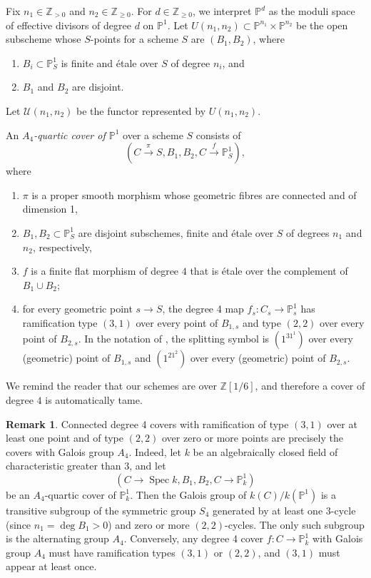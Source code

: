 \documentclass{amsart}
\numberwithin{equation}{section} \numberwithin{figure}{section}
\DeclareMathOperator{\Spec}{Spec}
\newcommand\PP{\mathbb{P}}
\newcommand\ZZ{\mathbb{Z}}
\newcommand{\cU}{\mathcal{U}}
\theoremstyle{one}
\theoremstyle{definition}
\newtheorem{remark}[theorem]{Remark}
\begin{document}
Fix 
\(n_1\in\mathbb{Z}_{>0}\) and 
\(n_2\in\mathbb{Z}_{\geq 0}\).
For
\(d\in\mathbb{Z}_{\geq 0}\), we interpret \(\PP^d\) as the moduli space of effective divisors of degree \(d\) on \(\PP^1\).
Let \(U(n_1,n_2) \subset \PP^{n_1} \times \PP^{n_2}\) be the open subscheme whose \(S\)-points for a scheme $S$ are \((B_1,B_2)\), where
\begin{enumerate}
\item \(B_i \subset \PP^{1}_S\) is finite and \'etale over \(S\) of degree \(n_i\), and 
 \item \(B_1\) and \(B_2\) are disjoint. 
 \end{enumerate}
 Let \(\cU(n_1,n_2)\) be the functor represented by \(U(n_1,n_2)\).
 
An \emph{\(A_4\)-quartic cover of $\PP^1$} over a scheme \(S\) consists of \[(C \xrightarrow{\pi} S, B_1, B_2, C \xrightarrow{f} \PP^1_S),\] 
where
\begin{enumerate}
\item \(\pi\) is a proper smooth morphism whose geometric fibres are connected and of dimension 1,
\item \(B_1, B_2 \subset \PP^1_S\) are disjoint subschemes, finite and \'etale over \(S\) of degrees \(n_1\) and \(n_2\), respectively,
\item \(f\) is a finite flat morphism of degree \(4\) that is \'etale over the complement of \(B_1 \cup B_2\);
\item for every geometric point \(s \to S\), the degree 4 map \(f_s \colon C_s \to \PP^1_s\) has ramification type \((3,1)\) over every point of \(B_{1,s}\) and type \((2,2)\) over every point of \(B_{2,s}\).
  In the notation of \cite[\S~2]{bha:07}, the splitting symbol is \((1^31^1)\) over every (geometric) point of \(B_{1,s}\) and \((1^21^2)\) over every (geometric) point of \(B_{2,s}\).
\end{enumerate}
We remind the reader that our schemes are over \(\ZZ[1/6]\), and therefore a cover of degree \(4\) is automatically tame.
\begin{remark}\label{rem:A4}
  Connected degree 4 covers with ramification of type \((3,1)\) over at least one point and of type \((2,2)\) over zero or more points are precisely the covers with Galois group \(A_4\).
  Indeed, let \(k\) be an algebraically closed field of characteristic greater than 3, and let \[(C\to \Spec{k}, B_1,B_2,  C \to \PP^1_k)\] 
  be an \(A_4\)-quartic cover of $\PP^1_k$.
  Then the Galois group of \(k(C) / k(\PP^1)\) is a transitive subgroup of the symmetric group \(S_4\) generated by at least one 3-cycle (since \(n_1 = \deg B_1 > 0\)) and zero or more \((2,2)\)-cycles.
  The only such subgroup is the alternating group \(A_4\).
  Conversely, any degree 4 cover \(f \colon C \to \PP^1_k\) with Galois group \(A_4\) must have ramification types \((3,1)\) or \((2,2)\), and \((3,1)\) must appear at least once.
  \end{remark}
\end{document}
